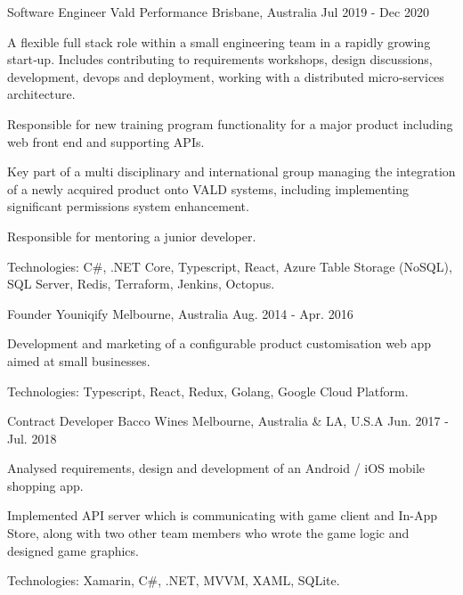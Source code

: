 \begin{cventries}
\cventry
{Software Engineer} %
{Vald Performance} %
{Brisbane, Australia} %
{Jul 2019 - Dec 2020} %
{
  \begin{cvitems} %
    \item {A flexible full stack role within a small engineering team in a rapidly growing start‑up. Includes contributing to requirements workshops, design discussions, development, devops and deployment, working with a distributed micro‑services architecture.}
    \item {Responsible for new training program functionality for a major product including web front end and supporting APIs.}
    \item {Key part of a multi disciplinary and international group managing the integration of a newly acquired product onto VALD systems, including implementing significant permissions system enhancement.}
    \item {Responsible for mentoring a junior developer.}
    \item {Technologies: C\#, .NET Core, Typescript, React, Azure Table Storage (NoSQL), SQL Server, Redis, Terraform, Jenkins, Octopus.}
  \end{cvitems}
}

\cventry
{Founder} %
{Youniqify} %
{Melbourne, Australia} %
{Aug. 2014 - Apr. 2016} %
{
  \begin{cvitems} %
    \item {Development and marketing of a configurable product customisation web app aimed at small businesses.}
    \item {Technologies: Typescript, React, Redux, Golang, Google Cloud Platform.} 
  \end{cvitems}
}

\cventry
{Contract Developer} %
{Bacco Wines} %
{Melbourne, Australia \& LA, U.S.A} %
{Jun. 2017 - Jul. 2018} %
{
  \begin{cvitems} %
    \item {Analysed requirements, design and development of an Android / iOS mobile shopping app.}
    \item {Implemented API server which is communicating with game client and In-App Store, along with two other team members who wrote the game logic and designed game graphics.}
    \item {Technologies: Xamarin, C\#, .NET, MVVM, XAML, SQLite.}
  \end{cvitems}
}


\end{cventries}
